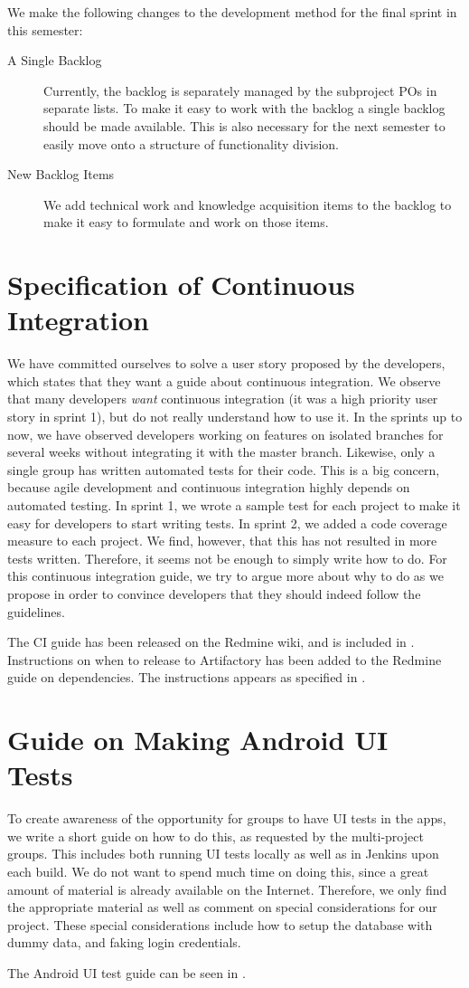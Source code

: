 We make the following changes to the development method for the final sprint in this semester:

\begin{description}
  \item[A Single Backlog] Currently, the backlog is separately managed by the subproject POs in separate lists. To make it easy to work with the backlog a single backlog should be made available. This is also necessary for the next semester to easily move onto a structure of functionality division.
  \item[New Backlog Items] We add technical work and knowledge acquisition items to the backlog to make it easy to formulate and work on those items.
\end{description}

\section{Specification of Continuous Integration}
We have committed ourselves to solve a user story proposed by the developers, which states that they want a guide about continuous integration. We observe that many developers \emph{want} continuous integration (it was a high priority user story in sprint 1), but do not really understand how to use it. In the sprints up to now, we have observed developers working on features on isolated branches for several weeks without integrating it with the master branch. Likewise, only a single group has written automated tests for their code. This is a big concern, because agile development and continuous integration highly depends on automated testing. In sprint 1, we wrote a sample test for each project to make it easy for developers to start writing tests. In sprint 2, we added a code coverage measure to each project. We find, however, that this has not resulted in more tests written. Therefore, it seems not be enough to simply write how to do. For this continuous integration guide, we try to argue more about why to do as we propose in order to convince developers that they should indeed follow the guidelines.

The CI guide has been released on the Redmine wiki, and is included in . Instructions on when to release to Artifactory has been added to the Redmine guide on dependencies. The instructions appears as specified in .

\section{Guide on Making Android UI Tests}
To create awareness of the opportunity for groups to have UI tests in the apps, we write a short guide on how to do this, as requested by the multi-project groups. This includes both running UI tests locally as well as in Jenkins upon each build. We do not want to spend much time on doing this, since a great amount of material is already available on the Internet. Therefore, we only find the appropriate material as well as comment on special considerations for our project. These special considerations include how to setup the database with dummy data, and faking login credentials.

The Android UI test guide can be seen in .